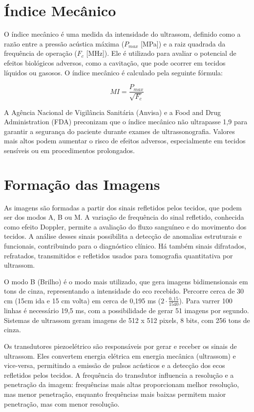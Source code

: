\documentclass[a4paper,12pt,oneside,openright]{abntex2}
\begin{document}
\section{Índice Mecânico}


O índice mecânico é uma medida da intensidade do ultrassom, definido como a razão entre a pressão acústica máxima ($P_{max}$ [MPa]) e a raiz quadrada da frequência de operação ($F_c$ [MHz]). Ele é utilizado para avaliar o potencial de efeitos biológicos adversos, como a cavitação, que pode ocorrer em tecidos líquidos ou gasosos. O índice mecânico é calculado pela seguinte fórmula:

\begin{equation}
  MI = \frac{P_{max}}{\sqrt{F_c}}
\end{equation}

A Agência Nacional de Vigilância Sanitária (Anvisa) e a Food and Drug Administration (FDA) preconizam que o índice mecânico não ultrapasse 1,9 para garantir a segurança do paciente durante exames de ultrassonografia. Valores mais altos podem aumentar o risco de efeitos adversos, especialmente em tecidos sensíveis ou em procedimentos prolongados.

\section{Formação das Imagens}

As imagens são formadas a partir dos sinais refletidos pelos tecidos, que podem ser dos modos A, B ou M. A variação de frequência do sinal refletido, conhecida como efeito Doppler, permite a avaliação do fluxo sanguíneo e do movimento dos tecidos. A análise desses sinais possibilita a detecção de anomalias estruturais e funcionais, contribuindo para o diagnóstico clínico. Há também sinais difratados, refratados, transmitidos e refletidos usados para tomografia quantitativa por ultrassom.

O modo B (Brilho) é o modo mais utilizado, que gera imagens bidimensionais em tons de cinza, representando a intensidade do eco recebido. Percorre cerca de 30 cm (15cm ida e 15 cm volta) em cerca de 0,195 ms ($2 \cdot \frac{0,15}{1540}$). Para varrer 100 linhas é necessário 19,5 ms, com a possibilidade de gerar 51 imagens por segundo. Sistemas de ultrassom geram imagens de 512 x 512 pixels, 8 bits, com 256 tons de cinza.

Os transdutores piezoelétrico são responsáveis por gerar e receber os sinais de ultrassom. Eles convertem energia elétrica em energia mecânica (ultrassom) e vice-versa, permitindo a emissão de pulsos acústicos e a detecção dos ecos refletidos pelos tecidos. A frequência do transdutor influencia a resolução e a penetração da imagem: frequências mais altas proporcionam melhor resolução, mas menor penetração, enquanto frequências mais baixas permitem maior penetração, mas com menor resolução.
\end{document}
